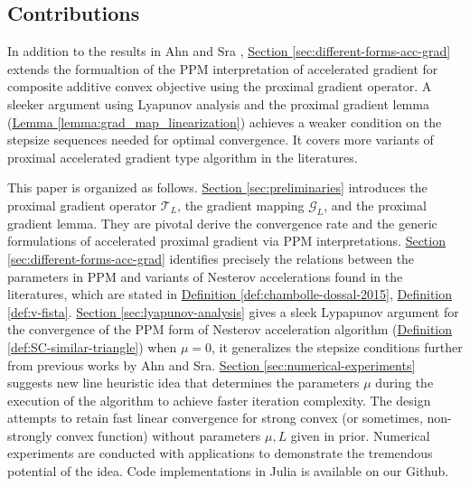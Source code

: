 \documentclass[12pt]{article}
\begin{document}
    \subsection{Contributions}
        \par
        In addition to the results in Ahn and Sra \cite{ahn_understanding_2022}, 
        \hyperref[sec:different-forms-acc-grad]{Section \ref*{sec:different-forms-acc-grad}}
        extends the formualtion of the PPM interpretation of accelerated gradient for composite additive convex objective using the proximal gradient operator. 
        A sleeker argument using Lyapunov analysis and the proximal gradient lemma 
        (\hyperref[lemma:grad_map_linearization]{Lemma \ref*{lemma:grad_map_linearization}}) achieves a weaker condition on the stepsize sequences needed for optimal convergence. 
        It covers more variants of proximal accelerated gradient type algorithm in the literatures. 
        \par
        This paper is organized as follows. 
        \hyperref[sec:preliminaries]{Section \ref*{sec:preliminaries}} introduces the proximal gradient operator $\mathcal T_L$, the gradient mapping $\mathcal G_L$, and the proximal gradient lemma. 
        They are pivotal derive the convergence rate and the generic formulations of accelerated proximal gradient via PPM interpretations. 
        \hyperref[sec:different-forms-acc-grad]{Section \ref*{sec:different-forms-acc-grad}}
        identifies precisely the relations between the parameters in PPM and variants of Nesterov accelerations found in the literatures, which are stated in 
        \hyperref[def:chambolle-dossal-2015]{Definition \ref*{def:chambolle-dossal-2015}}, 
        \hyperref[def:v-fista]{Definition \ref*{def:v-fista}}. 
        \hyperref[sec:lyapunov-analysis]{Section \ref*{sec:lyapunov-analysis}} gives a sleek Lypapunov argument for the convergence of the PPM form of Nesterov acceleration algorithm 
        (\hyperref[def:SC-similar-triangle]{Definition \ref*{def:SC-similar-triangle}}) 
        when $\mu = 0$, it generalizes the stepsize conditions further from previous works by Ahn and Sra. 
        \hyperref[sec:numerical-experiments]{Section \ref*{sec:numerical-experiments}}
        suggests new line heuristic idea that determines the parameters $\mu$ during the execution of the algorithm to achieve faster iteration complexity. 
        The design attempts to retain fast linear convergence for strong convex (or sometimes, non-strongly convex function) without parameters $\mu, L$ given in prior.         
        Numerical experiments are conducted with applications to demonstrate the tremendous potential of the idea. 
        Code implementations in Julia \cite{bezanson_julia_2017} is available on our Github. 
\end{document}
